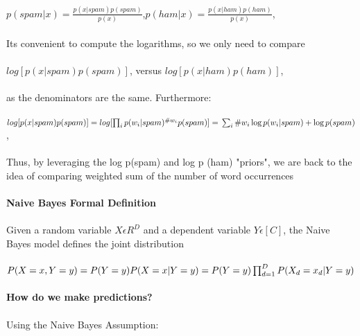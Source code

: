 \documentclass{article}
\begin{document}
\paragraph{}
\(p(spam|x)=\frac{p(x|spam)p(spam)}{p(x)}\),\(p(ham|x)=\frac{p(x|ham)p(ham)}{p(x)}\),\\\\
Its convenient to compute the logarithms, so we only need to compare
\paragraph{}
\(log[p(x|spam)p(spam)]\), versus \(log[p(x|ham)p(ham)]\),\\\\
as the denominators are the same. Furthermore:
\paragraph{}
\(log[p(x|spam)p(spam)] = log[\prod_{i} p(w_i|spam)^{\#w_i}p(spam)]=\\\\\sum_{i} \#w_i \log p(w_i|spam) + \log p(spam)\),\\\\
Thus, by leveraging the log p(spam) and log p (ham) "priors", we are back to the idea of comparing weighted sum of the number of word occurrences
\paragraph{Naive Bayes Formal Definition}
\paragraph{}
Given a random variable \(X \epsilon R^D\) and a dependent variable \(Y \epsilon [C]\), the Naive Bayes model defines the joint distribution
\paragraph{}
\(P(X=x, Y=y)=P(Y=y)P(X=x|Y=y)=\\\\P(Y=y)\prod_{d=1}^D P(X_d = x_d|Y=y)\)
\paragraph{How do we make predictions?}
\paragraph{}
Using the Naive Bayes Assumption:
\end{document}
